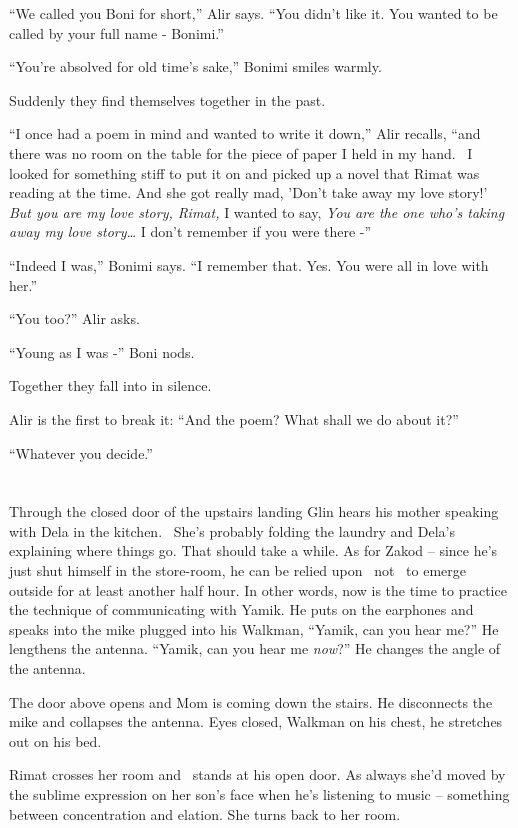 \documentclass[twoside,11pt]{book}
\begin{document}
``We called you Boni for short,'' Alir says. ``You didn't like it. You wanted to
be called by your full name - Bonimi.''

``You're absolved for old time's sake,'' Bonimi smiles warmly.

Suddenly they find themselves together in the past.

``I once had a poem in mind and wanted to write it down,'' Alir recalls, ``and
there was no room on the table for the piece of paper I held in my hand. ~I looked for something stiff to put it on and
picked up a novel that Rimat was reading at the time. And she got really mad, 'Don't take away my love story!'
\textit{But you are my love story, Rimat, }I wanted to say, \textit{You are the one who's taking away my love
story{\dots}} I don't remember if you were there -''

``Indeed I was,'' Bonimi says. ``I remember that. Yes. You were all in love with
her.''

``You too?'' Alir asks.

``Young as I was -'' Boni nods.

Together they fall into in silence.

Alir is the first to break it: ``And the poem? What shall we do about it?''

``Whatever you decide.''


\bigskip

\chapter{}

Through the closed door of the upstairs landing Glin hears his mother speaking with Dela in the kitchen. \ She's
probably folding the laundry and Dela's explaining where things go. That should take a while. As for Zakod -- since
he's just shut himself in the store-room, he can be relied upon \ not \ to emerge outside for at least another half
hour. In other words, now is the time to practice the technique of communicating with Yamik. He puts on the earphones
and speaks into the mike plugged into his Walkman, ``Yamik, can you hear me?'' He lengthens
the antenna. ``Yamik, can you hear me \textit{now}?'' He changes the angle of the antenna.

The door above opens and Mom is coming down the stairs. He disconnects the mike and collapses{ }the
antenna. Eyes closed, Walkman on his chest, he stretches out on his bed.

Rimat crosses her room and \ stands at his open door. As always she'd moved by the sublime expression on her son's face
when he's listening to music -- something between concentration and elation. She turns back to her room.
\end{document}
